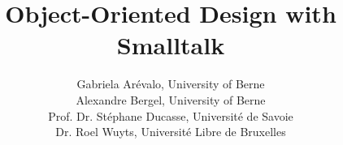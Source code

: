 \let\wholebook=\relax


\title{Object-Oriented Design with Smalltalk}
\author{Gabriela Ar\'evalo, University of Berne \\
Alexandre Bergel, University of Berne  \\
Prof. Dr. St\'ephane Ducasse, Universit\'e de Savoie  \\
Dr. Roel Wuyts, Universit\'e Libre de Bruxelles \\
}


\maketitle






